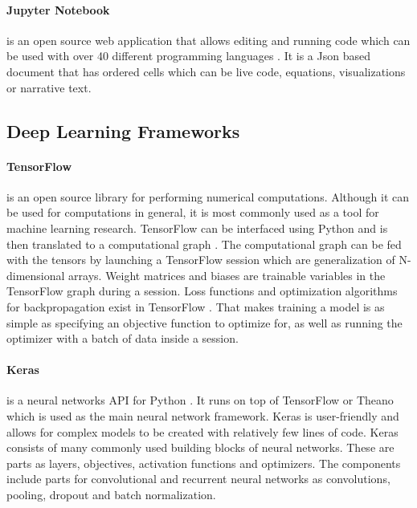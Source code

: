         \paragraph{Jupyter Notebook} is an open source web application that allows editing and running code
            which can be used with over 40 different programming languages \cite{kluyver2016jupyter}.
            It is a Json based document that has ordered cells which can be live code, equations, visualizations or narrative text.

    \subsection{Deep Learning Frameworks}

        \paragraph{TensorFlow} is an open source library for performing numerical computations. Although it can be used for computations in general,
            it is most commonly used as a tool for machine learning research.
            TensorFlow can be interfaced using Python and is then translated to a computational graph \cite{abadi2015tensorflow}.
            The computational graph can be fed with the tensors  by launching a TensorFlow session which are generalization of N-dimensional arrays.
            Weight matrices and biases are trainable variables in the TensorFlow graph during a session.
            Loss functions and optimization algorithms for backpropagation exist in TensorFlow \cite{johansen2019medical}.
            That makes training a model is as simple as specifying an objective function to optimize for, as well as running the optimizer with a batch of data inside a session.

        \paragraph{Keras} is a neural networks API for Python \cite{chollet2015}. It runs on top of TensorFlow or Theano \cite{mohan2019medical}
            which is used as the main neural network framework. Keras is user-friendly and allows for complex models to be created with relatively few lines of code.
            Keras consists of many commonly used building blocks of neural networks. These are parts as layers, objectives, activation functions and optimizers.
            The components include parts for convolutional and recurrent neural networks as convolutions, pooling, dropout and batch normalization.

